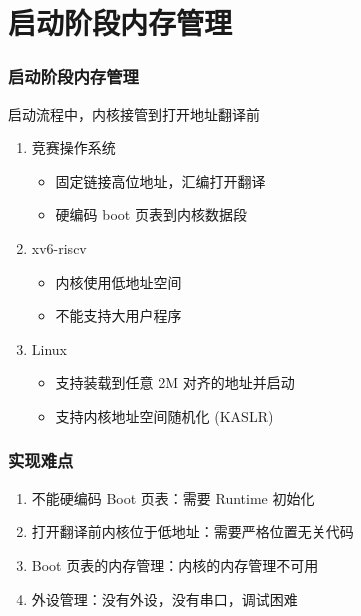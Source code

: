 \section{启动阶段内存管理}


\begin{frame}
    \frametitle{启动阶段内存管理}

    启动流程中，内核接管到打开地址翻译前

    \begin{enumerate}
        \item 竞赛操作系统
              \begin{itemize}
                  \item 固定链接高位地址，汇编打开翻译
                  \item 硬编码 boot 页表到内核数据段
              \end{itemize}
        \item xv6-riscv
              \begin{itemize}
                  \item 内核使用低地址空间
                  \item 不能支持大用户程序
              \end{itemize}
        \item Linux
              \begin{itemize}
                  \item 支持装载到任意 2M 对齐的地址并启动
                  \item 支持内核地址空间随机化 (KASLR)
              \end{itemize}
    \end{enumerate}

\end{frame}

\begin{frame}
    \frametitle{实现难点}


    \begin{enumerate}
        \item 不能硬编码 Boot 页表：需要 Runtime 初始化
        \item 打开翻译前内核位于低地址：需要严格位置无关代码
        \item Boot 页表的内存管理：内核的内存管理不可用
        \item 外设管理：没有外设，没有串口，调试困难
    \end{enumerate}

\end{frame}

